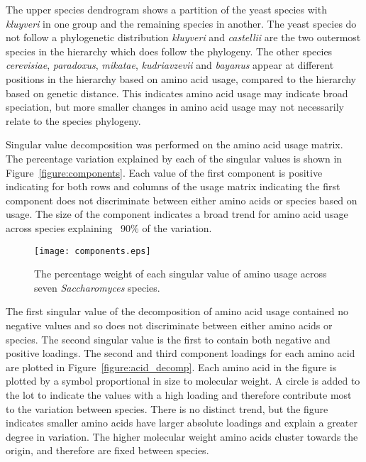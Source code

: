 The upper species dendrogram shows a partition of the yeast species with \emph{kluyveri} in one group and the remaining species in another. The yeast species do not follow a phylogenetic distribution \emph{kluyveri} and \emph{castellii} are the two outermost species in the hierarchy which does follow the phylogeny. The other species \emph{cerevisiae}, \emph{paradoxus}, \emph{mikatae}, \emph{kudriavzevii} and \emph{bayanus} appear at different positions in the hierarchy based on amino acid usage, compared to the hierarchy based on genetic distance. This indicates amino acid usage may indicate broad speciation, but more smaller changes in amino acid usage may not necessarily relate to the species phylogeny.

Singular value decomposition was performed on the amino acid usage matrix. The percentage variation explained by each of the singular values is shown in Figure~\vref{figure:components}. Each value of the first component is positive indicating for both rows and columns of the usage matrix indicating the first component does not discriminate between either amino acids or species based on usage. The size of the component indicates a broad trend for amino acid usage across species explaining ~90\% of the variation.

\begin{figure}
  \centering
  \texttt{[image: components.eps]}
  \caption[Components of amino acid usage singular value decomposition]{The percentage weight of each singular value of amino usage across seven \emph{Saccharomyces} species.}
  \label{figure:components}
\end{figure}

The first singular value of the decomposition of amino acid usage contained no negative values and so does not discriminate between either amino acids or species. The second singular value is the first to contain both negative and positive loadings. The second and third component loadings for each amino acid are plotted in Figure~\vref{figure:acid_decomp}. Each amino acid in the figure is plotted by a symbol proportional in size to molecular weight. A circle is added to the lot to indicate the values with a high loading and therefore contribute most to the variation between species. There is no distinct trend, but the figure indicates smaller amino acids have larger absolute loadings and explain a greater degree in variation. The higher molecular weight amino acids cluster towards the origin, and therefore are fixed between species.

